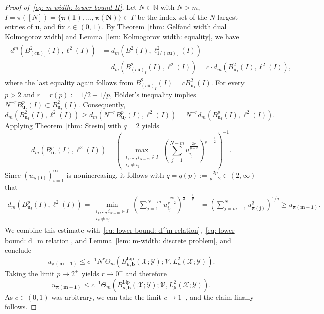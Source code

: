 \documentclass[namedate,webpdf]{ima-authoring-template-blank}
\newcommand*{\Lip}{\mathrm{Lip}}  %
\numberwithin{counter}{section}
\numberwithin{equation}{section}
\theoremstyle{plain}
\theoremstyle{definition}
\newcommand*{\cV}{\mathcal{V}}
\newcommand*{\cX}{\mathcal{X}}
\newcommand*{\cY}{\mathcal{Y}}
\newcommand*{\bbN}{\mathbb{N}}
\theoremstyle{thmstyletwo}
\begin{document}
\begin{proof}[Proof of~\eqref{eq: m-width: lower bound II}]
    Let \(N \in \bbN\) with \(N > m\),  \(I = \pi([N]) = \{\bm{\pi(1)}, \dots, \bm{\pi(N)}\} \subset \Gamma\) be the index set of the \(N\) largest entries of \(\bm{u}\), and fix \(c \in (0,1)\).
    By Theorem~\ref{thm: Gelfand width dual Kolmogorov width} and Lemma~\ref{lem: Kolmogorov width: equality}, we have
    \begin{align}
        \begin{split}\label{eq: lower bound: d^m relation}
        d^m(B_{(c \bm{u})_I}^2(I) , \ell^2(I)) 
        &= d_m(B^2(I), \ell_{1/(c\bm{u})_I}^2(I)) \\
        &= d_m(B_{(c \bm{u})_I}^2(I), \ell^2(I)) 
        = c \cdot d_m(B_{\bm{u}_I}^2(I), \ell^2(I)), 
        \end{split}
    \end{align}
    where the last equality again follows from \(B_{(c\bm{u})_I}^2(I) = c B_{\bm{u}_I}^2(I)\).
    For every \(p > 2\) and \(r = r(p) := 1/2 - 1/p\), H\"older's inequality implies \(N^{-r} B_{\bm{u}_I}^p(I) \subset B_{\bm{u}_I}^2(I)\). Consequently,
    \begin{equation}\label{eq: lower bound: d_m relation}
        d_m(B_{\bm{u}_I}^2(I), \ell^2(I)) \geq d_m(N^{-r} B_{\bm{u}_I}^p(I), \ell^2(I)) 
        = N^{-r} d_m(B_{\bm{u}_I}^p(I), \ell^2(I)).
    \end{equation}
    Applying Theorem~\ref{thm: Stesin} with \(q=2\) yields
    \[
    d_m(B_{\bm{u}_I}^p(I), \ell^2(I)) =  \left(\max_{\substack{i_1,\dots,i_{N-m}\in I \\ i_k \neq i_j}} \left(\sum_{j=1}^{N-m} u_{i_j}^{\frac{2p}{p-2}}\right)^{\frac{1}{p} - \frac{1}{2}}\right)^{-1}.
    \]
    Since \((u_{\bm{\pi(i)}})_{i=1}^{\infty}\) is nonincreasing, it follows with \(q = q(p) := \frac{2p}{p-2} \in (2,\infty)\) that
    \begin{align*}
        d_m(B_{\bm{u}_I}^p(I), \ell^2(I)) 
        = \min_{\substack{i_1,\dots,i_{N-m}\in I \\ i_k \neq i_j}} \left(\sum_{j=1}^{N-m} u_{i_j}^{\frac{2p}{p-2}}\right)^{\frac{1}{2} - \frac{1}{p}}
        &= \left(\sum_{j=m+1}^{N} u_{\bm{\pi(j)}}^{q}\right)^{1/q} 
        \geq u_{\bm{\pi(m+1)}}.
    \end{align*}
    We combine this estimate with~\eqref{eq: lower bound: d^m relation},~\eqref{eq: lower bound: d_m relation}, and Lemma~\ref{lem: m-width: discrete problem}, and conclude
    \[
    u_{\bm{\pi(m+1)}} \leq c^{-1} N^{r} \Theta_m(B_{\mu, \bm{b}}^{\Lip}(\cX; \cY); \cV, L_{\mu}^2(\cX; \cY)).
    \]
    Taking the limit \(p\to 2^+\) yields \(r\to 0^+\) and therefore
    \[
    u_{\bm{\pi(m+1)}} \leq c^{-1} \Theta_m(B_{\mu, \bm{b}}^{\Lip}(\cX; \cY); \cV, L_{\mu}^2(\cX; \cY)).
    \]
    As \(c\in (0,1)\) was arbitrary, we can take the limit \(c \to 1^-\), and the claim finally follows.
\end{proof}
\end{document}

